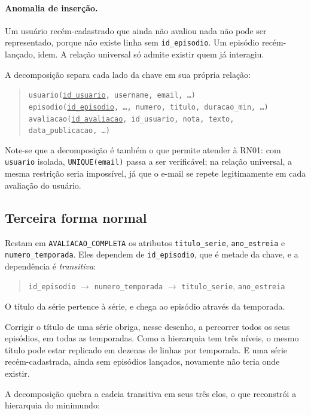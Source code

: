 \documentclass[a4paper,12pt,oneside,openany]{book}
\newcommand{\id}[1]{\texttt{#1}}
\begin{document}
\paragraph{Anomalia de inserção.} Um usuário recém-cadastrado que ainda não avaliou
nada não pode ser representado, porque não existe linha sem \id{id\_episodio}. Um
episódio recém-lançado, idem. A relação universal só admite existir quem já
interagiu.

A decomposição separa cada lado da chave em sua própria relação:

\begin{quote}
\id{usuario(\underline{id\_usuario}, username, email, \dots)}\\
\id{episodio(\underline{id\_episodio}, \dots, numero, titulo, duracao\_min, \dots)}\\
\id{avaliacao(\underline{id\_avaliacao}, id\_usuario, nota, texto, data\_publicacao,
\dots)}
\end{quote}

Note-se que a decomposição é também o que permite atender à RN01: com \id{usuario}
isolada, \id{UNIQUE(email)} passa a ser verificável; na relação universal, a mesma
restrição seria impossível, já que o e-mail se repete legitimamente em cada avaliação
do usuário.

\subsection{Terceira forma normal}

Restam em \id{AVALIACAO\_COMPLETA} os atributos \id{titulo\_serie},
\id{ano\_estreia} e \id{numero\_temporada}. Eles dependem de \id{id\_episodio}, que é
metade da chave, e a dependência é \emph{transitiva}:

\begin{quote}
\id{id\_episodio} $\rightarrow$ \id{numero\_temporada} $\rightarrow$
\id{titulo\_serie}, \id{ano\_estreia}
\end{quote}

O título da série pertence à série, e chega ao episódio através da temporada.

Corrigir o título de uma série obriga, nesse desenho, a percorrer todos os seus
episódios, em todas as temporadas. Como a hierarquia tem três níveis, o mesmo título
pode estar replicado em dezenas de linhas por temporada. E uma série recém-cadastrada,
ainda sem episódios lançados, novamente não teria onde existir.

A decomposição quebra a cadeia transitiva em seus três elos, o que reconstrói a
hierarquia do minimundo:
\end{document}
